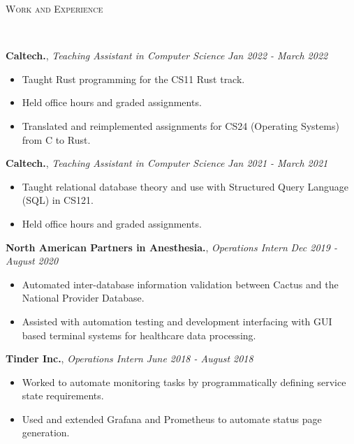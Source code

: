 \documentclass[9pt]{article}
\newenvironment{changemargin}[2]{%
  \begin{list}{}{%
    \setlength{\topsep}{0pt}%
    \setlength{\leftmargin}{#1}%
    \setlength{\rightmargin}{#2}%
    \setlength{\listparindent}{\parindent}%
    \setlength{\itemindent}{\parindent}%
    \setlength{\parsep}{\parskip}%
  }%
  \item[]}{\end{list}
}
\newcommand{\lineover}{
	\begin{changemargin}{-0.05in}{-0.05in}
		\vspace*{-8pt}
		\hrulefill \\
		\vspace*{-2pt}
	\end{changemargin}
}
\newcommand{\header}[1]{
	\begin{changemargin}{-0.5in}{-0.5in}
		\scshape{#1}\\
  	\lineover
	\end{changemargin}
}
\newenvironment{body} {
	\vspace*{-16pt}
	\begin{changemargin}{-0.25in}{-0.5in}
  }	
	{\end{changemargin}
}
\begin{document}
\header{Work and Experience}
\begin{body}
	\vspace{14pt}
	\textbf{Caltech.}, \emph{Teaching Assistant in Computer Science} \hfill
	\emph{Jan 2022 - March 2022}\\
	\vspace*{-3pt}
	\begin{itemize} \itemsep -0pt %
		\item Taught Rust programming for the CS11 Rust track.
		\item Held office hours and graded assignments.
		\item Translated and reimplemented assignments for CS24 (Operating
		      Systems) from C to Rust.
	\end{itemize}
	\vspace*{-2pt}

	\textbf{Caltech.}, \emph{Teaching Assistant in Computer Science} \hfill
	\emph{Jan 2021 - March 2021}\\
	\vspace*{-3pt}
	\begin{itemize} \itemsep -0pt %
		\item Taught relational database theory and use with Structured Query Language
		      (SQL) in CS121.
		\item Held office hours and graded assignments.
	\end{itemize}
	\vspace*{-2pt}

	\textbf{North American Partners in Anesthesia.}, \emph{Operations Intern} \hfill
	\emph{Dec 2019 - August 2020}\\
	\vspace*{-3pt}
	\begin{itemize} \itemsep -0pt %
		\item Automated inter-database information validation between Cactus and the
		      National Provider Database.
		\item Assisted with automation testing and development interfacing with GUI based terminal
		      systems for healthcare data processing.
	\end{itemize}
	\vspace*{-2pt}

	\textbf{Tinder Inc.}, \emph{Operations Intern} \hfill \emph{June 2018 - August 2018}\\
	\vspace*{-3pt}
	\begin{itemize} \itemsep -0pt %
		\item Worked to automate monitoring tasks by programmatically defining service state requirements.
		\item Used and extended Grafana and Prometheus to automate status page generation.
	\end{itemize}
	\vspace*{-2pt}


\end{body}
\end{document}
